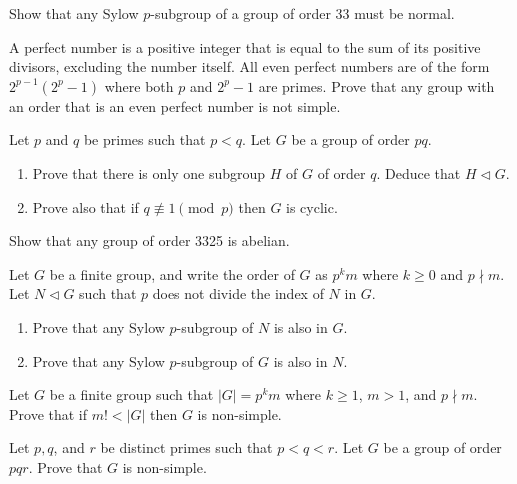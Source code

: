 \begin{problem}
    Show that any Sylow $p$-subgroup of a group of order 33 must be normal.
\end{problem}

\begin{problem}
    A perfect number is a positive integer that is equal to the sum of its positive divisors, excluding the number itself. All even perfect numbers are of the form $2^{p-1}\left(2^p-1\right)    $ where both $p$ and $2^p-1$ are primes. Prove that any group with an order that is an even perfect number is not simple.
\end{problem}

\begin{problem}
    Let $p$ and $q$ be primes such that $p < q$. Let $G$ be a group of order $pq$.
    \begin{enumerate}[label=(\roman*)]
        \item Prove that there is only one subgroup $H$ of $G$ of order $q$. Deduce that $H \lhd G$.
        \item Prove also that if $q \not\equiv 1 \pmod p$ then $G$ is cyclic.
    \end{enumerate}
\end{problem}

\begin{problem}
    Show that any group of order 3325 is abelian.
\end{problem}

\begin{problem}
    Let $G$ be a finite group, and write the order of $G$ as $p^km$ where $k \geq 0$ and $p \nmid m$. Let $N \lhd G$ such that $p$ does not divide the index of $N$ in $G$.
    \begin{enumerate}[label=(\roman*)]
        \item Prove that any Sylow $p$-subgroup of $N$ is also in $G$.
        \item Prove that any Sylow $p$-subgroup of $G$ is also in $N$.
    \end{enumerate}
\end{problem}

\begin{problem}
    Let $G$ be a finite group such that $|G| = p^km$ where $k \geq 1$,  $m > 1$, and $p \nmid m$. Prove that if $m! < |G|$ then $G$ is non-simple.
\end{problem}

\begin{problem}
    Let $p, q$, and $r$ be distinct primes such that $p < q < r$. Let $G$ be a group of order $pqr$. Prove that $G$ is non-simple.
\end{problem}

